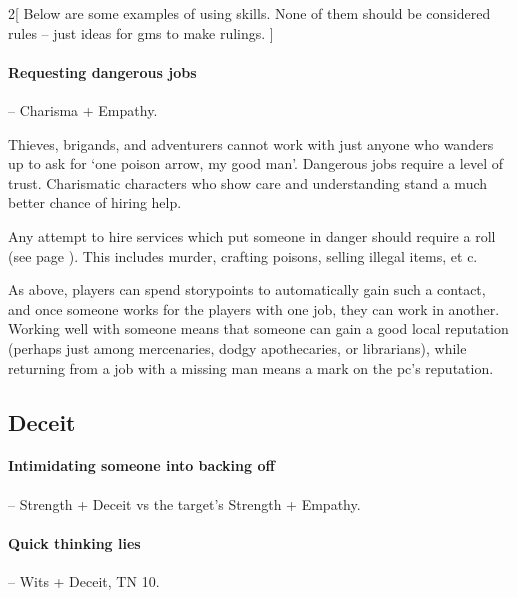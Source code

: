 \begin{multicols}{2}[
  Below are some examples of using skills.
  None of them should be considered rules -- just ideas for \glspl{gm} to make rulings.
]
\paragraph{Requesting dangerous jobs} -- Charisma + Empathy.


Thieves, brigands, and \iftoggle{aif}{illegal}{} adventurers cannot work with just anyone who wanders up to ask for `one poison arrow, my good man'.
Dangerous jobs require a level of trust.
Charismatic characters who show care and understanding stand a much better chance of hiring help.

Any attempt to hire services which put someone in danger should require a roll (see page \pageref{services}).
This includes murder, crafting poisons, selling illegal items, et c.

As above, players can spend \glspl{storypoint} to automatically gain such a contact, and once someone works for the players with one job, they can work in another.
Working well with someone means that someone can gain a good local reputation (perhaps just among mercenaries, dodgy apothecaries, or librarians), while returning from a job with a missing man means a mark on the \gls{pc}'s reputation.

\subsection{Deceit}

\paragraph{Intimidating someone into backing off} -- Strength + Deceit vs the target's Strength + Empathy.

\paragraph{Quick thinking lies} -- Wits + Deceit, TN 10.


\end{multicols}
